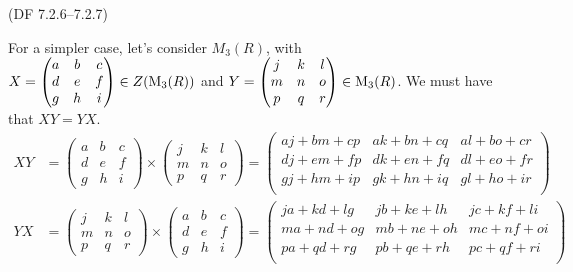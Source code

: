 \begin{problem}{(\textsf{DF 7.2.6--7.2.7})}
\begin{enumalph}
\begin{Answer}
        For a simpler case, let's consider $M_3(R)$, with \\
        $X = \begin{pmatrix} a & b & c \\ d & e & f \\ g & h & i \end{pmatrix} \in Z(\operatorname{M}_3(R))$
        and $Y = \begin{pmatrix} j & k & l \\ m & n & o \\ p & q & r \end{pmatrix} \in \operatorname{M}_3(R)$.
        We must have that $XY = YX$.
        \begin{align*}
          XY &= \begin{pmatrix} a & b & c \\ d & e & f \\ g & h & i \end{pmatrix}
                \times \begin{pmatrix} j & k & l \\ m & n & o \\ p & q & r \end{pmatrix}
                = \begin{pmatrix}
                    aj + bm + cp & ak + bn + cq & al + bo + cr \\
                    dj + em + fp & dk + en + fq & dl + eo + fr \\
                    gj + hm + ip & gk + hn + iq & gl + ho + ir \\
                  \end{pmatrix} \\
          YX &= \begin{pmatrix} j & k & l \\ m & n & o \\ p & q & r \end{pmatrix}
                \times \begin{pmatrix} a & b & c \\ d & e & f \\ g & h & i \end{pmatrix}
                = \begin{pmatrix}
                    ja + kd + {l}g & jb + ke + lh & jc + kf + li \\
                    ma + nd + og & mb + ne + oh & mc + nf + oi \\
                    pa + qd + rg & pb + qe + rh & pc + qf + ri \\
                  \end{pmatrix} \\
        \end{align*}


\end{Answer}
\end{enumalph}
\end{problem}
